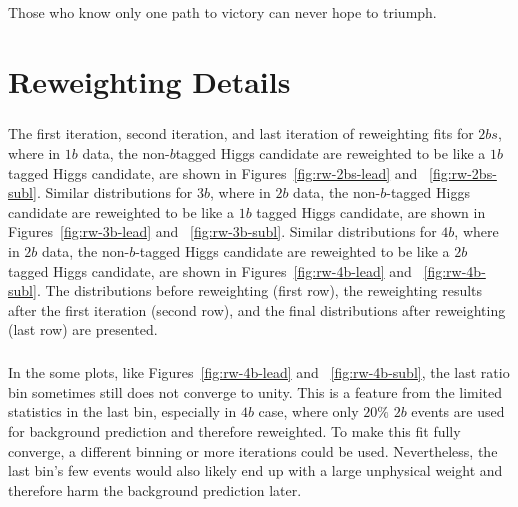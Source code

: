 \begin{savequote}[75mm]
Those who know only one path to victory can never hope to triumph.  
\end{savequote}
\chapter{Reweighting Details}
\label{AppendixRW}

\paragraph{}
The first iteration, second iteration, and last iteration of reweighting fits for $2bs$, where in $1b$ data, the non-$b$tagged Higgs candidate are reweighted to be like a $1b$ tagged Higgs candidate, are shown in Figures~\ref{fig:rw-2bs-lead} and ~\ref{fig:rw-2bs-subl}. 
Similar distributions for $3b$, where in $2b$ data, the non-$b$-tagged Higgs candidate are reweighted to be like a $1b$ tagged Higgs candidate, are shown in Figures~\ref{fig:rw-3b-lead} and ~\ref{fig:rw-3b-subl}. 
Similar distributions for $4b$, where in $2b$ data, the non-$b$-tagged Higgs candidate are reweighted to be like a $2b$ tagged Higgs candidate, are shown in Figures~\ref{fig:rw-4b-lead} and ~\ref{fig:rw-4b-subl}. 
The distributions before reweighting (first row), the reweighting results after the first iteration (second row), and the final distributions after reweighting (last row) are presented.

\paragraph{}
In the some plots, like Figures~\ref{fig:rw-4b-lead} and ~\ref{fig:rw-4b-subl}, the last ratio bin sometimes still does not converge to unity. 
This is a feature from the limited statistics in the last bin, especially in $4b$ case, where only $20\%$ $2b$ events are used for background prediction and therefore reweighted.
To make this fit fully converge, a different binning or more iterations could be used.
Nevertheless, the last bin's few events would also likely end up with a large unphysical weight and therefore harm the background prediction later.

